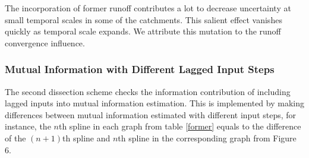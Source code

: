 \documentclass[review]{elsarticle}
\begin{document}
The incorporation of former runoff contributes a lot to decrease uncertainty at small temporal scales in some of the catchments. This salient effect vanishes quickly as temporal scale expands. We attribute this  mutation to the runoff convergence influence.     
 
\subsubsection{Mutual Information with Different Lagged Input Steps}
The second dissection scheme checks the information contribution of including lagged inputs into mutual information estimation. This is implemented by making differences between mutual information estimated with different input steps, for instance, the $n$th spline in each graph from table \ref{former}  equals to the difference of the   $(n+1)$th spline and  $n$th spline in the corresponding graph from Figure 6.
\end{document}
